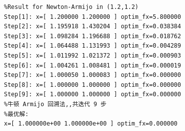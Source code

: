 \begin{lstlisting}
%Result for Newton-Armijo in (1.2,1.2)
Step[1]: x=[ 1.200000 1.200000 ] optim_fx=5.800000
Step[2]: x=[ 1.195918 1.430204 ] optim_fx=0.038384
Step[3]: x=[ 1.098284 1.196688 ] optim_fx=0.018762
Step[4]: x=[ 1.064488 1.131993 ] optim_fx=0.004289
Step[5]: x=[ 1.011992 1.021372 ] optim_fx=0.000903
Step[6]: x=[ 1.004261 1.008481 ] optim_fx=0.000019
Step[7]: x=[ 1.000050 1.000083 ] optim_fx=0.000000
Step[8]: x=[ 1.000000 1.000000 ] optim_fx=0.000000
Step[9]: x=[ 1.000000 1.000000 ] optim_fx=0.000000
%牛顿 Armijo 回溯法,,共迭代 9 步
%最优解:
x=[ 1.000000e+00 1.000000e+00 ] optim_fx=0.000000
\end{lstlisting}

\begin{figure}[H]
\centering
{}

\end{figure}
